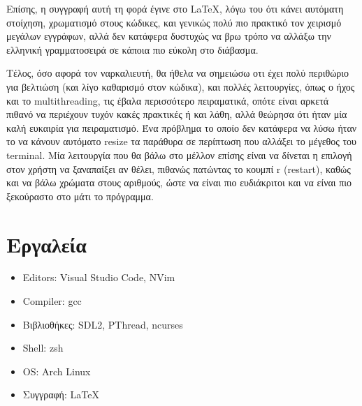 \documentclass{article}
\begin{document}
    Επίσης, η συγγραφή αυτή τη φορά έγινε στο \LaTeX, λόγω του ότι κάνει αυτόματη στοίχηση, χρωματισμό στους
    κώδικες, και γενικώς πολύ πιο πρακτικό τον χειρισμό μεγάλων εγγράφων, αλλά δεν κατάφερα δυστυχώς να βρω τρόπο
    να αλλάξω την ελληνική γραμματοσειρά σε κάποια πιο εύκολη στο διάβασμα.  
    
    Τέλος, όσο αφορά τον ναρκαλιευτή, θα ήθελα να σημειώσω οτι έχει πολύ περιθώριο για βελτιώση (και λίγο καθαρισμό στον κώδικα),
    και πολλές λειτουργίες, όπως ο ήχος και το multithreading, τις έβαλα περισσότερο πειραματικά, οπότε είναι αρκετά πιθανό να περιέχουν τυχόν
    κακές πρακτικές ή και λάθη, αλλά θεώρησα ότι ήταν μία καλή ευκαιρία για πειραματισμό. Ένα πρόβλημα το οποίο δεν κατάφερα
    να λύσω ήταν το να κάνουν αυτόματο resize τα παράθυρα σε περίπτωση που αλλάξει το μέγεθος του terminal. Μία λειτουργία που 
    θα βάλω στο μέλλον επίσης είναι να δίνεται η επιλογή στον χρήστη να ξαναπαίξει αν θέλει, πιθανώς πατώντας το κουμπί r (restart),
    καθώς και να βάλω χρώματα στους αριθμούς, ώστε να είναι πιο ευδιάκριτοι και να είναι πιο ξεκούραστο στο μάτι το πρόγραμμα.

\section{Εργαλεία}

    \begin{itemize}
        \item Editors: Visual Studio Code, NVim
        \item Compiler: gcc
        \item Βιβλιοθήκες: SDL2, PThread, ncurses
        \item Shell: zsh
        \item OS: Arch Linux
        \item Συγγραφή: \LaTeX
    \end{itemize}
\end{document}
